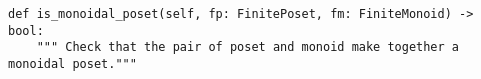 \begin{verbatim}
def is_monoidal_poset(self, fp: FinitePoset, fm: FiniteMonoid) -> bool:
    """ Check that the pair of poset and monoid make together a monoidal poset."""
\end{verbatim}